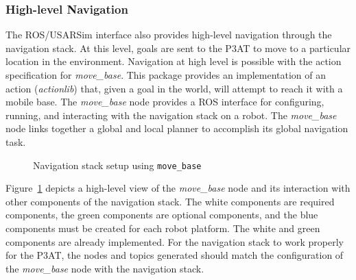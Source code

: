 \subsubsection*{High-level Navigation}
The ROS/USARSim interface also provides high-level navigation through the navigation stack. At this level, goals are sent to the P3AT to move to a particular location in the environment. Navigation at high level is possible with the action specification for {\it move\_base}. This package provides an implementation of an action ({\it actionlib}) that, given a goal in the world, will attempt to reach it with a mobile base. The {\it move\_base} node provides a ROS interface for configuring, running, and interacting with the navigation stack on a robot. The {\it move\_base} node links together a global and local planner to accomplish its global navigation task.



\begin{figure}[t!]
\centering
{}
\caption{\label{fig:navigation_stack}Navigation stack setup using \texttt{move\_base}}
\end{figure}

Figure~\ref{fig:navigation_stack} depicts a high-level view of the {\it move\_base} node and its interaction with other components of the navigation stack. The white components are required components, the green components are optional components, and the blue components must be created for each robot platform. The white and green components are already implemented. For the navigation stack to work properly for the P3AT, the nodes and topics generated should match the configuration of the {\it move\_base} node with the navigation stack.


